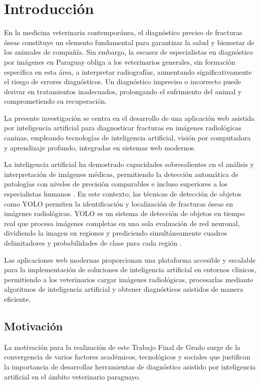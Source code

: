 \fancyhead{}
\fancyfoot{}

\chapter{Introducción}
En la medicina veterinaria contemporánea, el diagnóstico preciso de fracturas óseas constituye un elemento fundamental para garantizar la salud y bienestar de los animales de compañía. Sin embargo, la escasez de especialistas en diagnóstico por imágenes en Paraguay obliga a los veterinarios generales, sin formación específica en esta área, a interpretar radiografías, aumentando significativamente el riesgo de errores diagnósticos. Un diagnóstico impreciso o incorrecto puede derivar en tratamientos inadecuados, prolongando el sufrimiento del animal y comprometiendo su recuperación.

La presente investigación se centra en el desarrollo de una aplicación web asistida por inteligencia artificial para diagnosticar fracturas en imágenes radiológicas caninas, empleando tecnologías de inteligencia artificial, visión por computadora y aprendizaje profundo, integradas en sistemas web modernos.

La inteligencia artificial ha demostrado capacidades sobresalientes en el análisis y interpretación de imágenes médicas, permitiendo la detección automática de patologías con niveles de precisión comparables e incluso superiores a los especialistas humanos \cite{krizhevsky2012}. En este contexto, las técnicas de detección de objetos como YOLO permiten la identificación y localización de fracturas óseas en imágenes radiológicas. YOLO es un sistema de detección de objetos en tiempo real que procesa imágenes completas en una sola evaluación de red neuronal, dividiendo la imagen en regiones y prediciendo simultáneamente cuadros delimitadores y probabilidades de clase para cada región \cite{yolo_paper}.

Las aplicaciones web modernas proporcionan una plataforma accesible y escalable para la implementación de soluciones de inteligencia artificial en entornos clínicos, permitiendo a los veterinarios cargar imágenes radiológicas, procesarlas mediante algoritmos de inteligencia artificial y obtener diagnósticos asistidos de manera eficiente.

\section{Motivación}
La motivación para la realización de este Trabajo Final de Grado surge de la convergencia de varios factores académicos, tecnológicos y sociales que justifican la importancia de desarrollar herramientas de diagnóstico asistido por inteligencia artificial en el ámbito veterinario paraguayo.

